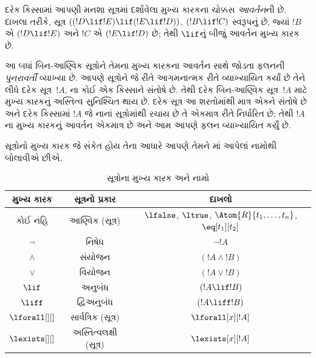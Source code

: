 દરેક કિસ્સામાં આપણી મનશા સૂત્રમાં દર્શાવેલા મુખ્ય કારકના ચોક્કસ
\emph{આવર્તન}ની છે. દાખલા તરીકે, સૂત્ર
$((!D\lif !E)\lif(!E\lif !D))$, $(!B\lif !C)$ સ્વરૂપનું છે, જ્યાં
$!B$ એ $(!D\lif !E)$ અને $!C$ એ $(!E\lif !D)$ છે; તેથી $\lif$નું
બીજું આવર્તન મુખ્ય કારક છે.

\begin{explain}
આ બધાં બિન-આણ્વિક સૂત્રોને તેમના મુખ્ય કારકના આવર્તન
સાથે જોડતા ફલનની \emph{પુનરાવર્તી} વ્યાખ્યા છે. આપણે
સૂત્રોને જે રીતે આગમનાત્મક રીતે વ્યાખ્યાયિત કર્યાં છે તેને
લીધે દરેક સૂત્ર~$!A$, ના કોઈ એક કિસ્સાને
સંતોષે છે. તેથી દરેક બિન-આણ્વિક સૂત્ર~$!A$ માટે મુખ્ય કારકનું અસ્તિત્વ સુનિશ્ચિત થાય છે. દરેક સૂત્ર આ શરતોમાંથી
માત્ર એકને સંતોષે છે અને દરેક કિસ્સામાં $!A$ જે નાનાં
સૂત્રોમાંથી રચાય છે તે એકમાત્ર રીતે નિર્ધારિત છે; તેથી $!A$ના
મુખ્ય કારકનું આવર્તન એકમાત્ર છે અને આમ આપણે ફલન
વ્યાખ્યાયિત કર્યું છે.
\end{explain}

સૂત્રોનો મુખ્ય કારક જે સંકેત હોય તેના આધારે આપણે તેમને
માં આપેલાં નામોથી બોલાવીએ છીએ.


\begin{table}[!h]
\centering
\begin{tabular}{c | c | c}
મુખ્ય કારક & સૂત્રનો પ્રકાર & દાખલો\\
\hline
કોઈ નહિ & આણ્વિક (સૂત્ર) &
$\lfalse$,
$\ltrue$,
$\Atom{R}{t_1, \dots, t_n}$,
$\eq[t_1][t_2]$\\
$\lnot$ & નિષેધ & $\lnot !A$ \\
$\land$ & સંયોજન & $(!A \land !B)$ \\
$\lor$ & વિયોજન & $(!A \lor !B)$ \\
$\lif$ & અનુબંધ & $(!A \lif !B)$ \\
$\liff$ & દ્વિઅનુબંધ & $(!A \liff !B)$ \\
$\lforall[][]$ & સાર્વત્રિક (સૂત્ર)& $\lforall[x][!A]$ \\
$\lexists[][]$ & અસ્તિત્વલક્ષી (સૂત્ર)& $\lexists[x][!A]$
\end{tabular}
\caption{સૂત્રોના મુખ્ય કારક અને નામો}
\end{table}
\endgroup


